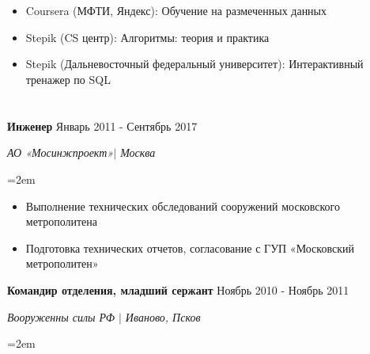 \documentclass{article}
\newcommand{\NewPart}[1]{\section*{{\color{gray}{#1}}}}
\newcommand{\ExperienceEntry}[4]{
		\noindent \textbf{#1} \hfill  
		\hfill #2 \par  %
		\noindent \textit{#3} \par        %
		\noindent\hangindent=2em\hangafter=0 \small #4 %
		\normalsize \par}
\begin{document}
\NewPart{Курсы }{}
{	
\begin{itemize}
	\item{Coursera (МФТИ, Яндекс): Обучение на размеченных данных}
	\item{Stepik (CS центр): Алгоритмы: теория и практика}
	\item{Stepik (Дальневосточный федеральный университет): Интерактивный тренажер по SQL}
        
\end{itemize}
}

\NewPart{Дополнительно }{}
{	

\ExperienceEntry
{Инженер}
{Январь 2011 - Сентябрь 2017}
{АО  «Мосинжпроект»$\vert$ Москва}
{	
\begin{itemize}
	\item{Выполнение технических обследований сооружений московского метрополитена}
	\item{Подготовка технических отчетов, согласование с ГУП «Московский метрополитен»}
\end{itemize}
}

\ExperienceEntry
{Командир отделения, младший сержант}
{Ноябрь 2010 - Ноябрь 2011}
{Вооруженны силы РФ $\vert$ Иваново, Псков}
{	

}
}
\end{document}
